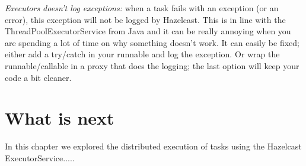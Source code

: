 \emph{Executors doesn't log exceptions:} when a task fails with an exception (or an error), this exception will not be logged by Hazelcast. This is in line with the ThreadPoolExecutorService from Java and it can be really annoying when you are spending a lot of time on why something doesn't work. It can easily be fixed; either add a try/catch in your runnable and log the exception. Or wrap the runnable/callable in a proxy that does the logging; the last option will keep your code a bit cleaner. 

\section{What is next}
In this chapter we explored the distributed execution of tasks using the Hazelcast ExecutorService.....